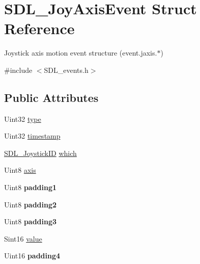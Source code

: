 \hypertarget{structSDL__JoyAxisEvent}{}\section{S\+D\+L\+\_\+\+Joy\+Axis\+Event Struct Reference}
\label{structSDL__JoyAxisEvent}


Joystick axis motion event structure (event.\+jaxis.$\ast$)  




{\ttfamily \#include $<$S\+D\+L\+\_\+events.\+h$>$}

\subsection*{Public Attributes}
\begin{DoxyCompactItemize}
\item 
Uint32 \hyperlink{structSDL__JoyAxisEvent_aed1c873fb90ba58194e65f972933c67d}{type}
\item 
Uint32 \hyperlink{structSDL__JoyAxisEvent_a60ecfc70df9eeef8e33b5dd7dc060389}{timestamp}
\item 
\hyperlink{SDL__joystick_8h_a3c3d32500cb08f76ee8077983912c0bd}{S\+D\+L\+\_\+\+Joystick\+ID} \hyperlink{structSDL__JoyAxisEvent_a965719f4703a7091bcc5f07f79fcf7e1}{which}
\item 
Uint8 \hyperlink{structSDL__JoyAxisEvent_a0beac2fb161e45771c424bd0b6daeabb}{axis}
\item 
\mbox{\label{structSDL__JoyAxisEvent_ae8e17bced478530638982f0382a0dafa}} 
Uint8 {\bfseries padding1}
\item 
\mbox{\label{structSDL__JoyAxisEvent_ad5407250032f618fde7437ac5f229257}} 
Uint8 {\bfseries padding2}
\item 
\mbox{\label{structSDL__JoyAxisEvent_a8bf5144fddc19686c2003add1f0e1565}} 
Uint8 {\bfseries padding3}
\item 
Sint16 \hyperlink{structSDL__JoyAxisEvent_a53ee73e7c367934dd6edb69963be5556}{value}
\item 
\mbox{\label{structSDL__JoyAxisEvent_a604b258940a8cd8beaa5efeb55d6f825}} 
Uint16 {\bfseries padding4}
\end{DoxyCompactItemize}


